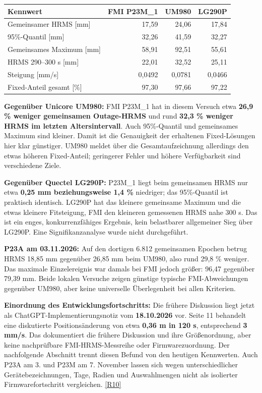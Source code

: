 \documentclass[11pt,a4paper]{article}
\numberwithin{equation}{section}
\numberwithin{figure}{section}
\begin{document}
\begin{center}\begin{lrbox}{\reporttable}\small\setlength{\tabcolsep}{4pt}\begin{tabular}{lrrr}\toprule
Kennwert & FMI P23M\_1 & UM980 & LG290P\\\midrule
Gemeinsamer HRMS [mm] & 17,59 & 24,06 & 17,84\\
95\%-Quantil [mm] & 32,26 & 41,59 & 32,27\\
Gemeinsames Maximum [mm] & 58,91 & 92,51 & 55,61\\
HRMS 290–300 s [mm] & 22,01 & 32,52 & 25,11\\
Steigung [mm/\allowbreak{}s] & 0,0492 & 0,0781 & 0,0466\\
Fixed-Anteil gesamt [\%] & 97,30 & 97,66 & 97,22\\
\bottomrule\end{tabular}\end{lrbox}\ifdim\wd\reporttable>\linewidth\resizebox{\linewidth}{!}{\usebox{\reporttable}}\else\usebox{\reporttable}\fi\end{center}

\textbf{Gegenüber Unicore UM980:} FMI P23M\_1 hat in diesem Versuch etwa \textbf{26,9 \% weniger gemeinsamen Outage-HRMS} und rund \textbf{32,3 \% weniger HRMS im letzten Altersintervall}. Auch 95\%-Quantil und gemeinsames Maximum sind kleiner. Damit ist die Genauigkeit der erhaltenen Fixed-Lösungen hier klar günstiger. UM980 meldet über die Gesamtaufzeichnung allerdings den etwas höheren Fixed-Anteil; geringerer Fehler und höhere Verfügbarkeit sind verschiedene Ziele.

\textbf{Gegenüber Quectel LG290P:} P23M\_1 liegt beim gemeinsamen HRMS nur etwa \textbf{0,25 mm beziehungsweise 1,4 \%} niedriger; das 95\%-Quantil ist praktisch identisch. LG290P hat das kleinere gemeinsame Maximum und die etwas kleinere Fitsteigung, FMI den kleineren gemessenen HRMS nahe 300 s. Das ist ein enges, konkurrenzfähiges Ergebnis, kein belastbarer allgemeiner Sieg über LG290P. Eine Signifikanzanalyse wurde nicht durchgeführt.

\textbf{P23A am 03.11.2026:} Auf den dortigen 6.812 gemeinsamen Epochen betrug HRMS 18,85 mm gegenüber 26,85 mm beim UM980, also rund 29,8 \% weniger. Das maximale Einzelereignis war damals bei FMI jedoch größer: 96,47 gegenüber 79,39 mm. Beide lokalen Versuche zeigen günstige typische FMI-Abweichungen gegenüber UM980, aber keine universelle Überlegenheit bei allen Kriterien.

\textbf{Einordnung des Entwicklungsfortschritts:} Die frühere Diskussion liegt jetzt als ChatGPT-Implementierungsnotiz vom \textbf{18.10.2026} vor. Seite 11 behandelt eine diskutierte Positionsänderung von etwa \textbf{0,36 m in 120 s}, entsprechend \textbf{3 mm/\allowbreak{}s}. Das dokumentiert die frühere Diskussion und ihre Größenordnung, aber keine nachprüfbare FMI-HRMS-Messreihe oder Firmwarezuordnung. Der nachfolgende Abschnitt trennt diesen Befund von den heutigen Kennwerten. Auch P23A am 3. und P23M am 7. November lassen sich wegen unterschiedlicher Gerätebezeichnungen, Tage, Radien und Auswahlmengen nicht als isolierter Firmwarefortschritt vergleichen. \hyperlink{ref-R10}{[R10]}
\end{document}
